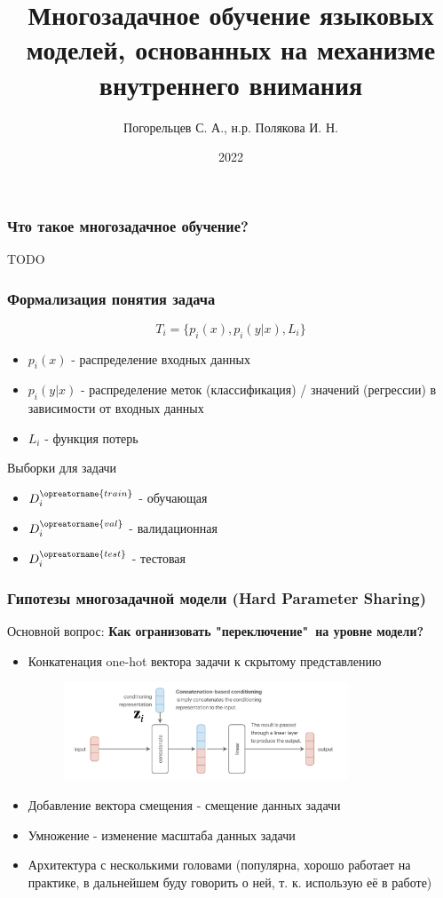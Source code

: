\documentclass[aspectratio=169]{beamer}
\title{Многозадачное обучение языковых моделей, основанных на механизме внутреннего внимания}
\author{Погорельцев С. А., н.р. Полякова И. Н.}
\institute{МГУ им. Ломоносова, ф-т ВМК, каф. АЯ}
\date{2022}
\begin{document}
\frame{\titlepage}

\section[Многозадачное обучение]{}

\begin{frame}
	\frametitle{Что такое многозадачное обучение?}
	TODO
\end{frame}

\begin{frame}
	\frametitle{Формализация понятия задача}
	\begin{equation}
		T_i = \{p_i(x), p_i(y | x), L_i\}
	\end{equation}
	\begin{itemize}
		\item $p_i(x)$ - распределение входных данных
		\item $p_i(y | x)$ - распределение меток (классификация) / значений (регрессии) в зависимости от входных данных
		\item $L_i$ - функция потерь
	\end{itemize}
	Выборки для задачи
	\begin{itemize}
		\item $D_i^{\opreatorname{train}}$ - обучающая
		\item $D_i^{\opreatorname{val}}$ - валидационная
		\item $D_i^{\opreatorname{test}}$ - тестовая
	\end{itemize}
\end{frame}

\begin{frame}
\frametitle{Гипотезы многозадачной модели (Hard Parameter Sharing)}
Основной вопрос: \textbf{Как огранизовать "переключение"\ на уровне модели?}
\begin{itemize}
	\item Конкатенация one-hot вектора задачи к скрытому представлению
	\begin{figure}
       	\includegraphics[width=0.8\textwidth]{assets/cat_based_cond.png}
    \end{figure}
	\item Добавление вектора смещения - смещение данных задачи
	\item Умножение - изменение масштаба данных задачи
	\item Архитектура с несколькими головами (популярна, хорошо работает на практике, в дальнейшем буду говорить о ней, т. к. использую её в работе)
\end{itemize}
\end{frame}
\end{document}
